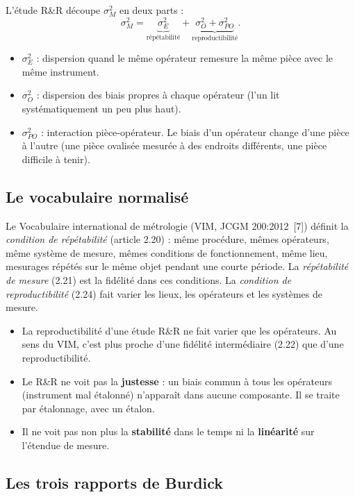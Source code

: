 \documentclass[11pt,a4paper]{article}
\theoremstyle{sj}
\theoremstyle{definition}
\theoremstyle{remark}
\providecommand{\og}{\guillemotleft\nobreakspace}
\providecommand{\fg}{\nobreakspace\guillemotright}
\newcommand{\nosp}[1]{{\XeTeXinterchartokenstate=0 #1}}
\begin{document}
L'étude R\&R découpe $\sigma_M^2$ en deux parts :
\[
\sigma_M^2=\underbrace{\sigma_E^2}_{\text{répétabilité}}+\underbrace{\sigma_O^2+\sigma_{PO}^2}_{\text{reproductibilité}}.
\]
\begin{itemize}[leftmargin=1.4em]
\item $\sigma_E^2$ : dispersion quand le même opérateur remesure la même pièce avec le même instrument.
\item $\sigma_O^2$ : dispersion des biais propres à chaque opérateur (l'un lit systématiquement un peu plus haut).
\item $\sigma_{PO}^2$ : interaction pièce-opérateur. Le biais d'un opérateur change d'une pièce à l'autre (une pièce ovalisée mesurée à des endroits différents, une pièce difficile à tenir).
\end{itemize}

\subsection{Le vocabulaire normalisé}

Le Vocabulaire international de métrologie (VIM, \nosp{JCGM 200:2012}~[7]) définit la \emph{condition de répétabilité} (article 2.20) : même procédure, mêmes opérateurs, même système de mesure, mêmes conditions de fonctionnement, même lieu, mesurages répétés sur le même objet pendant une courte période. La \emph{répétabilité de mesure} (2.21) est la fidélité dans ces conditions. La \emph{condition de reproductibilité} (2.24) fait varier les lieux, les opérateurs et les systèmes de mesure.

\begin{attention}
\begin{itemize}[leftmargin=1.2em]
\item La \og reproductibilité\fg{} d'une étude R\&R ne fait varier que les opérateurs. Au sens du VIM, c'est plus proche d'une fidélité intermédiaire (2.22) que d'une reproductibilité.
\item Le R\&R ne voit pas la \textbf{justesse} : un biais commun à tous les opérateurs (instrument mal étalonné) n'apparaît dans aucune composante. Il se traite par étalonnage, avec un étalon.
\item Il ne voit pas non plus la \textbf{stabilité} dans le temps ni la \textbf{linéarité} sur l'étendue de mesure.
\end{itemize}
\end{attention}

\subsection{Les trois rapports de Burdick}
\end{document}
